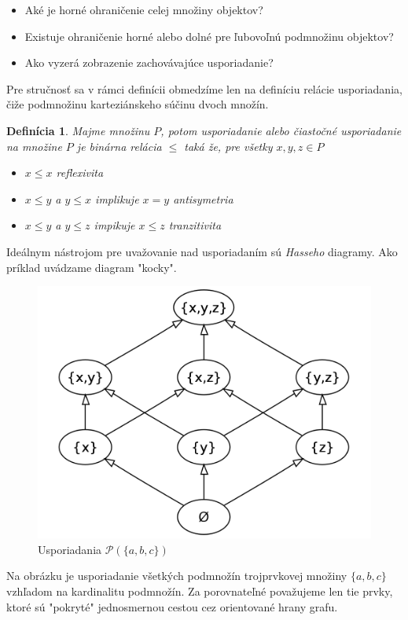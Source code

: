 \documentclass[a4paper,10pt,oneside]{report}%
\newtheorem{definition}{Definícia}[chapter]
\begin{document}
\begin{itemize}
    \item Aké je horné ohraničenie celej množiny objektov?
    \item Existuje ohraničenie horné alebo dolné pre ľubovoľnú podmnožinu objektov?
    \item Ako vyzerá zobrazenie zachovávajúce usporiadanie?
\end{itemize}
    Pre stručnosť sa v rámci definícii obmedzíme len na definíciu relácie usporiadania,
čiže podmnožinu karteziánskeho súčinu dvoch množín.
\begin{definition}
    Majme množinu $P$, potom usporiadanie alebo čiastočné usporiadanie na množine
    $P$ je binárna relácia $\leq$ taká že, pre všetky $x,y,z \in P$
    \begin{itemize}
        \item $x \leq x$ reflexivita
        \item $x \leq y$ a $y \leq x$ implikuje $x = y$ antisymetria
        \item $x \leq y$ a $y \leq z$ impikuje $x \leq z$ tranzitivita
    \end{itemize}
\end{definition}
    Ideálnym nástrojom pre uvažovanie nad usporiadaním sú \emph{Hasseho} diagramy.
    Ako príklad uvádzame diagram "kocky".
\begin{figure}[!ht]
    \centering
    \includegraphics[scale=0.20]{cube.png}
    \caption{Usporiadania $\mathcal{P}(\{a,b,c\})$}
\end{figure}

    Na obrázku je usporiadanie všetkých podmnožín trojprvkovej množiny $\{ a,b,c \}$
vzhľadom na kardinalitu podmnožín.
    Za porovnateľné považujeme len tie prvky, ktoré sú "pokryté" jednosmernou cestou 
cez orientované hrany grafu.
\end{document}
